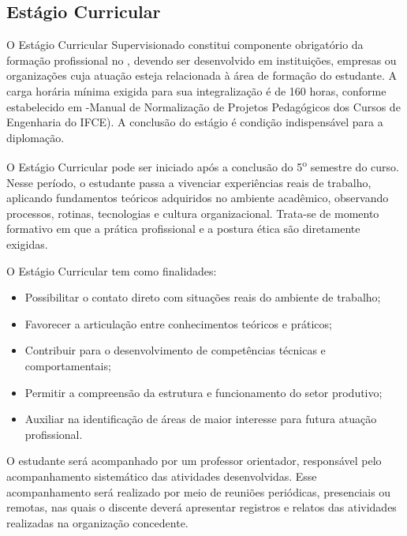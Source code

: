 %
%

\subsection{Estágio Curricular}

O Estágio Curricular Supervisionado constitui componente obrigatório da formação profissional no \NOMECURSO, devendo ser desenvolvido em instituições, empresas ou organizações cuja atuação esteja relacionada à área de formação do estudante. A carga horária mínima exigida para sua integralização é de 160 horas, conforme estabelecido em -Manual de Normalização de Projetos Pedagógicos dos Cursos de Engenharia do IFCE). A conclusão do estágio é condição indispensável para a diplomação.

O Estágio Curricular pode ser iniciado após a conclusão do 5\textsuperscript{o} semestre do curso. Nesse período, o estudante passa a vivenciar experiências reais de trabalho, aplicando fundamentos teóricos adquiridos no ambiente acadêmico, observando processos, rotinas, tecnologias e cultura organizacional. Trata-se de momento formativo em que a prática profissional e a postura ética são diretamente exigidas.

O Estágio Curricular tem como finalidades:

\begin{itemize}
	\item Possibilitar o contato direto com situações reais do ambiente de trabalho;
	\item Favorecer a articulação entre conhecimentos teóricos e práticos;
	\item Contribuir para o desenvolvimento de competências técnicas e comportamentais;
	\item Permitir a compreensão da estrutura e funcionamento do setor produtivo;
	\item Auxiliar na identificação de áreas de maior interesse para futura atuação profissional.
\end{itemize}

O estudante será acompanhado por um professor orientador, responsável pelo acompanhamento sistemático das atividades desenvolvidas. Esse acompanhamento será realizado por meio de reuniões periódicas, presenciais ou remotas, nas quais o discente deverá apresentar registros e relatos das atividades realizadas na organização concedente.

